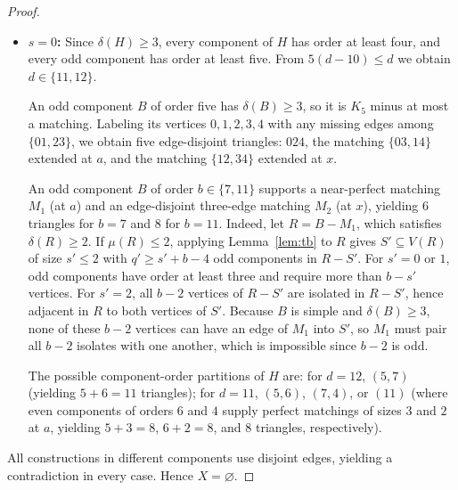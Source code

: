 \documentclass[11pt]{article}
\begin{document}
\begin{proof}
\begin{itemize}
We claim that any odd component $B$ of $H[D]$ of order $b\in\{5,7\}$ supports a near-perfect matching $M_1$ (at $a$) and an edge-disjoint two-edge matching $M_2$ (at $x$), yielding $(b-1)/2+2$ triangles ($4$ for $b=5$, $5$ for $b=7$). Start with a near-perfect matching $M_1$ of $B$; then $B-M_1$ has minimum degree at least one. If $B-M_1$ has no two-edge matching, it must be a spanning star centered at the vertex $c$ missed by $M_1$, with $M_1$ pairing all leaves. Replacing one leaf-pair edge $u_1v_1\in M_1$ with $cu_1$ gives a new near-perfect matching $M_1'$, and taking $M_2'=\{u_1v_1,cu_2\}$ (using a leaf $u_2$ from another pair) gives the desired edge-disjoint two-edge matching.

The possible component-order partitions of $H-S$ are: for $d=11$, $(3,7)$, $(5,5)$, or $(3,3,4)$ (where the even order-$4$ component supplies a two-edge matching at $a$); for $d=12$, $(3,3,5)$; for $d=13$, $(3,3,3,3)$. Every case yields at least eight edge-disjoint triangles.
\item \textbf{$s=0$:} Since $\delta(H)\geq 3$, every component of $H$ has order at least four, and every odd component has order at least five. From $5(d-10)\leq d$ we obtain $d\in\{11,12\}$.

An odd component $B$ of order five has $\delta(B)\geq 3$, so it is $K_5$ minus at most a matching. Labeling its vertices $0,1,2,3,4$ with any missing edges among $\{01,23\}$, we obtain five edge-disjoint triangles: $024$, the matching $\{03,14\}$ extended at $a$, and the matching $\{12,34\}$ extended at $x$.

An odd component $B$ of order $b\in\{7,11\}$ supports a near-perfect matching $M_1$ (at $a$) and an edge-disjoint three-edge matching $M_2$ (at $x$), yielding $6$ triangles for $b=7$ and $8$ for $b=11$. Indeed, let $R=B-M_1$, which satisfies $\delta(R)\geq 2$. If $\mu(R)\leq 2$, applying Lemma~\ref{lem:tb} to $R$ gives $S'\subseteq V(R)$ of size $s'\leq 2$ with $q'\geq s'+b-4$ odd components in $R-S'$. For $s'=0$ or $1$, odd components have order at least three and require more than $b-s'$ vertices. For $s'=2$, all $b-2$ vertices of $R-S'$ are isolated in $R-S'$, hence adjacent in $R$ to both vertices of $S'$. Because $B$ is simple and $\delta(B)\geq 3$, none of these $b-2$ vertices can have an edge of $M_1$ into $S'$, so $M_1$ must pair all $b-2$ isolates with one another, which is impossible since $b-2$ is odd.

The possible component-order partitions of $H$ are: for $d=12$, $(5,7)$ (yielding $5+6=11$ triangles); for $d=11$, $(5,6)$, $(7,4)$, or $(11)$ (where even components of orders $6$ and $4$ supply perfect matchings of sizes $3$ and $2$ at $a$, yielding $5+3=8$, $6+2=8$, and $8$ triangles, respectively).
\end{itemize}
All constructions in different components use disjoint edges, yielding a contradiction in every case. Hence $X=\varnothing$.
\end{proof}
\end{document}
